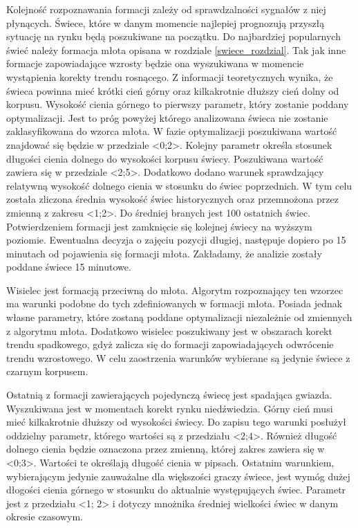 \documentclass[pdflatex,11pt]{aghdpl}
\begin{document}
Kolejność rozpoznawania formacji zależy od sprawdzalności sygnałów z niej płynących. Świece, które w danym momencie najlepiej prognozują przyszłą sytuację na rynku będą poszukiwane na początku. Do najbardziej popularnych świeć należy formacja młota opisana w rozdziale \ref{swiece_rozdzial}. Tak jak inne formacje zapowiadające wzrosty będzie ona wyszukiwana w momencie wystąpienia korekty trendu rosnącego. Z informacji teoretycznych wynika, że świeca powinna mieć krótki cień górny oraz kilkakrotnie dłuższy cień dolny od korpusu. Wysokość cienia górnego to pierwszy parametr, który zostanie poddany optymalizacji. Jest to próg powyżej którego analizowana świeca nie zostanie zaklasyfikowana do wzorca młota. W fazie optymalizacji poszukiwana wartość znajdować się będzie w przedziale <0;2>. Kolejny parametr określa stosunek długości cienia dolnego do wysokości korpusu świecy. Poszukiwana wartość zawiera się w przedziale <2;5>. Dodatkowo dodano warunek sprawdzający relatywną wysokość dolnego cienia w stosunku do świec poprzednich. W tym celu została zliczona średnia wysokość świec historycznych oraz przemnożona przez zmienną z zakresu <1;2>. Do średniej branych jest 100 ostatnich świec. Potwierdzeniem formacji jest zamknięcie się kolejnej świecy na wyższym poziomie. Ewentualna decyzja o zajęciu pozycji długiej, następuje dopiero po 15 minutach od pojawienia się formacji młota. Zakładamy, że analizie zostały poddane świece 15 minutowe. 

Wisielec jest formacją przeciwną do młota. Algorytm rozpoznający ten wzorzec ma warunki podobne do tych zdefiniowanych w formacji młota. Posiada jednak własne parametry, które zostaną poddane optymalizacji niezależnie od zmiennych z algorytmu młota. Dodatkowo wisielec poszukiwany jest w obszarach korekt trendu spadkowego, gdyż zalicza się do formacji zapowiadających odwrócenie trendu wzrostowego. W celu zaostrzenia warunków wybierane są jedynie świece z czarnym korpusem.

Ostatnią z formacji zawierających pojedynczą świecę jest spadająca gwiazda. Wyszukiwana jest w momentach korekt rynku niedźwiedzia. Górny cień musi mieć kilkakrotnie dłuższy od wysokości świecy. Do zapisu tego warunki posłużył oddzielny parametr, którego wartości są z przedziału <2;4>. Również długość dolnego cienia będzie oznaczona przez zmienną, której zakres zawiera się w <0;3>. Wartości te określają długość cienia w pipsach. Ostatnim warunkiem, wybierającym jedynie zauważalne dla większości graczy świece, jest wymóg dużej dłogości cienia górnego w stosunku do aktualnie występujących świec. Parametr jest z przedziału <1; 2> i dotyczy mnożnika średniej wielkości świec w danym okresie czasowym.  
\end{document}
